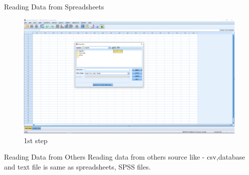 \begin{frame}[t]{Reading Data from Spreadsheets}
	\begin{figure}
		\centering
		\includegraphics[width=12cm]{img/xls_data_1}
		\caption{1st step}
	\end{figure}
\end{frame}
\begin{frame}[t]{Reading Data from Others}
	Reading data from others source like - csv,database and text file is same as spreadsheets, SPSS files.
\end{frame}



